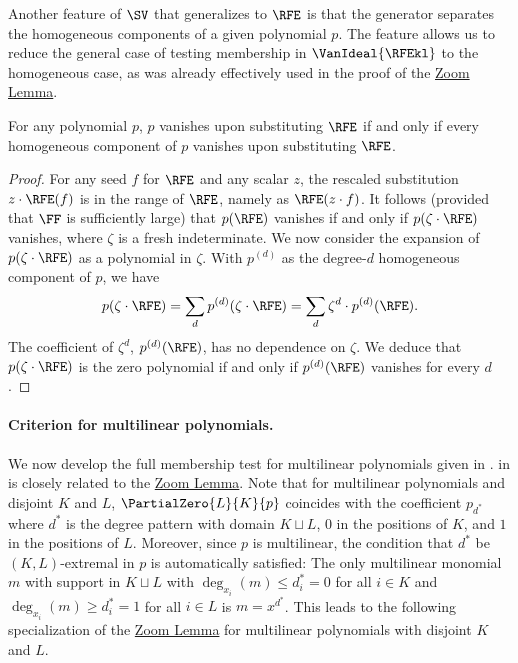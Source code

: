\documentclass{toc}
\begin{document}
Another feature of $\SV$ that generalizes to $\RFE$ is that the generator separates the homogeneous components of a given polynomial $p$. The feature allows us to reduce the general case of testing membership in $\VanIdeal{\RFEkl}$ to the homogeneous case, as was already effectively used in the proof of the \hyperref[lem.multi-zsub-deriv]{Zoom Lemma}.
\begin{proposition}
  \label{prop.rfe-homog}
  For any polynomial \(p\),
  \(p\) vanishes upon substituting \(\RFE\)
  if and only if 
  every homogeneous component of \(p\) vanishes upon substituting \(\RFE\).
\end{proposition}
\begin{proof}
  For any seed \(f\) for \(\RFE\)
  and any scalar \(z\),
  the rescaled substitution \(z \cdot \RFE(f)\)
  is in the range of \(\RFE\),
  namely as \(\RFE(z\cdot f)\).
  It follows (provided that \(\FF\) is sufficiently large)
  that \(p(\RFE)\) vanishes
  if and only if
  \(p(\zeta\cdot\RFE)\) vanishes,
  where \(\zeta\) is a fresh indeterminate.
  We now consider the expansion of \(p(\zeta\cdot\RFE)\)
  as a polynomial in \(\zeta\).
  With \(p^{(d)}\) as the degree-\(d\) homogeneous component of \(p\),
  we have
  \begin{equation*}
    p(\zeta \cdot \RFE)
      = \sum_d p^{(d)}(\zeta \cdot \RFE)
      = \sum_d \zeta^d \cdot p^{(d)}(\RFE).
  \end{equation*}
  The coefficient of \(\zeta^d\), \(p^{(d)}(\RFE)\),
  has no dependence on \(\zeta\).
  We deduce that
  \(p(\zeta\cdot\RFE)\) is the zero polynomial
  if and only if
  \(p^{(d)}(\RFE)\) vanishes for every \(d\).
\end{proof}

\paragraph{Criterion for multilinear polynomials.}

We now develop the full membership test for multilinear polynomials given in .  in  is closely related to the \hyperref[lem.multi-zsub-deriv]{Zoom Lemma}. Note that for multilinear polynomials and disjoint \(K\) and \(L\), \(\PartialZero{L}{K}{p}\) coincides with the coefficient \(p_{d^*}\) where \(d^*\) is the degree pattern with domain \(K \sqcup L\), \(0\) in the positions of \(K\), and \(1\) in the positions of \(L\).
Moreover, since \(p\) is multilinear,
the condition that \(d^*\) be \((K,L)\)-extremal in \(p\) is
automatically satisfied:
The only multilinear monomial \({m}\) with support in 
\(K\sqcup L\) with
\(\deg_{x_i}({m}) \le d^*_i = 0\) for all \(i\in K\)
and
\(\deg_{x_i}({m}) \ge d^*_i = 1\) for all \(i\in L\)
is \({m} = x^{d^*}\).
This leads to the following specialization of the \hyperref[lem.multi-zsub-deriv]{Zoom Lemma} for multilinear
polynomials with disjoint \(K\) and \(L\).
\end{document}
